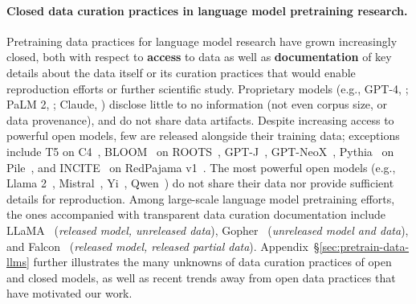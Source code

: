 \documentclass{article}
\begin{document}
\paragraph{Closed data curation practices in language model pretraining research.} 
Pretraining data practices for language model research have grown increasingly closed, both with respect to \textbf{access} to data as well as \textbf{documentation} of key details about the data itself or its curation practices that would enable reproduction efforts or further scientific study.
Proprietary models (e.g., GPT-4, \citealp{OpenAI2023GPT4TR}; PaLM 2, \citealp{Anil2023PaLM2T}; Claude, \citealp{claude-announce}) disclose little to no information (not even corpus size, or data provenance), and do not share data artifacts.
Despite increasing access to powerful open models, few are released alongside their training data; exceptions include T5 on C4~\citep{raffel2020exploring}, BLOOM~\citep{leong-etal-2022-bloom} on ROOTS~\citep{piktus-etal-2023-roots}, GPT-J~\citep{gpt-j}, GPT-NeoX~\citep{Black2022GPTNeoX20BAO}, Pythia~\citep{Biderman2023PythiaAS} on Pile~\citep{Gao2020ThePA}, and INCITE~\citep{together2023incite} on RedPajama v1~\citep{together2023redpajama}.
The most powerful open models (e.g., Llama 2~\citep{Touvron2023Llama2O}, Mistral~\citep{mistral}, Yi~\citep{qwen}, Qwen~\citep{yi34b}) do not share their data nor provide sufficient details for reproduction.
Among large-scale language model pretraining efforts, the ones accompanied with transparent data curation documentation include LLaMA~\citep{Touvron2023LLaMAOA} (\emph{released model, unreleased data}), Gopher~\citep{Rae2021ScalingLM} (\emph{unreleased model and data}), and Falcon~\citep{falcon40b} (\emph{released model, released partial data}).
Appendix~\S\ref{sec:pretrain-data-llms} further illustrates the many unknowns of data curation practices of open and closed models, as well as recent trends away from open data practices that have motivated our work.
\end{document}
